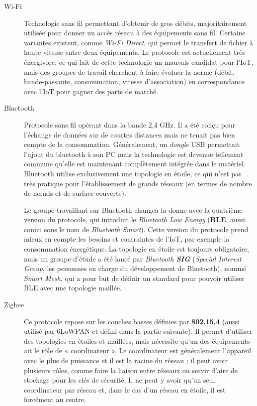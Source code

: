\begin{description}
	\item[Wi-Fi]
	Technologie sans fil permettant d'obtenir de gros débits, majoritairement utilisée pour donner un accès réseau à des équipements sans fil. Certaine variantes existent, comme \textit{Wi-Fi Direct}, qui permet le transfert de fichier à haute vitesse entre deux équipements. Le protocole est actuellement très énergivore, ce qui fait de cette technologie un mauvais candidat pour l'IoT, mais des groupes de travail cherchent à faire évoluer la norme (débit, bande-passante, consommation, vitesse d'association) en correspondance avec l'IoT pour gagner des parts de marché.

	\item[Bluetooth]
	Protocole sans fil opérant dans la bande 2,4 GHz. Il a été conçu pour l'échange de données sur de courtes distances mais ne tenait pas bien compte de la consommation. Généralement, un \textit{dongle} USB permettait l'ajout du bluetooth à son PC mais la technologie est devenue tellement commune qu'elle est maintenant complètement intégrée dans le matériel. Bluetooth utilise exclusivement une topologie en étoile, ce qui n'est pas très pratique pour l'établissement de grands réseaux (en termes de nombre de nœuds et de surface couverte).

	Le groupe travaillant sur Bluetooth changea la donne avec la quatrième version du protocole, qui introduit le \textit{Bluetooth Low Energy} (\textbf{BLE}, aussi connu sous le nom de \textit{Bluetooth Smart}). Cette version du protocole prend mieux en compte les besoins et contraintes de l'IoT, par exemple la consommation énergétique. La topologie en étoile est toujours obligatoire, mais un groupe d'étude a été lancé par \textit{Bluetooth \textbf{SIG}} (\textit{Special Interest Group}, les personnes en charge du développement de Bluetooth), nommé \textit{Smart Mesh}, qui a pour but de définir un standard pour pouvoir utiliser BLE avec une topologie maillée.

	\item[Zigbee]
	Ce protocole repose sur les couches basses définies par \textbf{802.15.4} (aussi utilisé par 6LoWPAN et défini dans la partie suivante). Il permet d’utiliser des topologies en étoiles et maillées, mais nécessite qu’un des équipements ait le rôle de « coordinateur ». Le coordinateur est généralement l'appareil avec le plus de puissance et il est la racine du réseau ; il peut avoir plusieurs rôles, comme faire la liaison entre réseaux ou servir d’aire de stockage pour les clés de sécurité. Il ne peut y avoir qu'un seul coordinateur par réseau et, dans le cas d'un réseau en étoile, il est forcément au centre.


\end{description}

